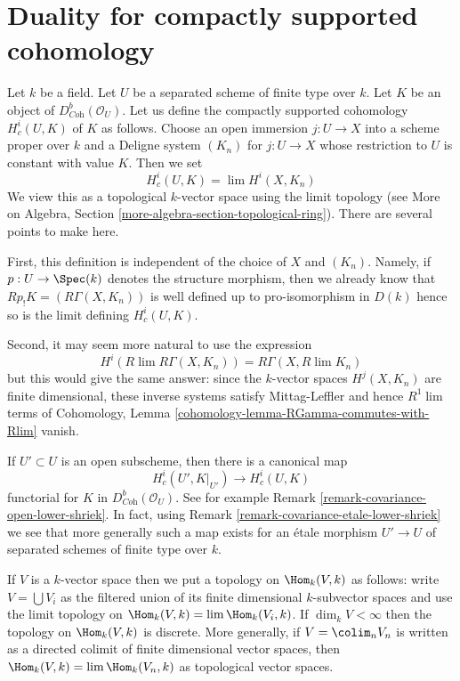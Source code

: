 \section{Duality for compactly supported cohomology}
\label{section-duality-compactly-supported}

\noindent
Let $k$ be a field. Let $U$ be a separated scheme of finite type over $k$.
Let $K$ be an object of $D^b_{\textit{Coh}}(\mathcal{O}_U)$. Let us define
the compactly supported cohomology $H^i_c(U, K)$ of $K$ as follows.
Choose an open immersion $j : U \to X$ into a scheme proper over $k$
and a Deligne system $(K_n)$ for $j : U \to X$ whose restriction
to $U$ is constant with value $K$. Then we set
$$
H^i_c(U, K) = \lim H^i(X, K_n)
$$
We view this as a topological $k$-vector space using the limit topology
(see More on Algebra, Section \ref{more-algebra-section-topological-ring}).
There are several points to make here.

\medskip\noindent
First, this definition is independent of the choice of $X$ and $(K_n)$.
Namely, if $p : U \to \Spec(k)$ denotes the structure morphism, then
we already know that $Rp_!K = (R\Gamma(X, K_n))$
is well defined up to pro-isomorphism in $D(k)$ hence so is the limit
defining $H^i_c(U, K)$.

\medskip\noindent
Second, it may seem more natural to use the expression
$$
H^i(R\lim R\Gamma(X, K_n)) = R\Gamma(X, R\lim K_n)
$$
but this would give the same answer: since the $k$-vector spaces
$H^j(X, K_n)$ are finite dimensional, these inverse systems satisfy
Mittag-Leffler and hence $R^1\lim$ terms of Cohomology, Lemma
\ref{cohomology-lemma-RGamma-commutes-with-Rlim} vanish.

\medskip\noindent
If $U' \subset U$ is an open subscheme, then there is a canonical map
$$
H^i_c(U', K|_{U'}) \longrightarrow H^i_c(U, K)
$$
functorial for $K$ in $D^b_{\textit{Coh}}(\mathcal{O}_U)$.
See for example Remark \ref{remark-covariance-open-lower-shriek}.
In fact, using Remark \ref{remark-covariance-etale-lower-shriek}
we see that more generally such a map exists for an \'etale morphism
$U' \to U$ of separated schemes of finite type over $k$.

\medskip\noindent
If $V$ is a $k$-vector space then we put a topology on $\Hom_k(V, k)$
as follows: write $V = \bigcup V_i$ as the filtered union of its finite
dimensional $k$-subvector spaces and use the limit topology on
$\Hom_k(V, k) = \lim \Hom_k(V_i, k)$. If $\dim_k V < \infty$ then
the topology on $\Hom_k(V, k)$ is discrete. More generally, if
$V = \colim_n V_n$ is written as a directed colimit of finite dimensional
vector spaces, then $\Hom_k(V, k) = \lim \Hom_k(V_n, k)$ as topological
vector spaces.


